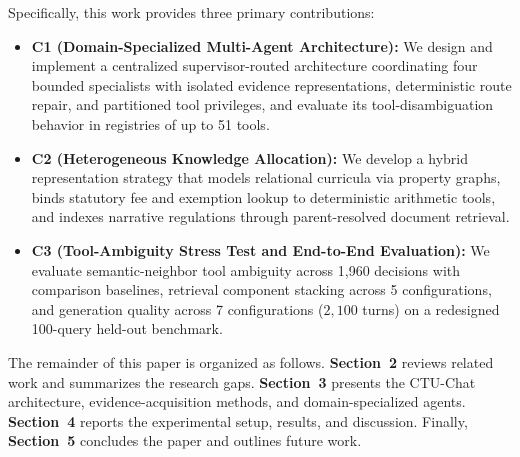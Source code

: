 Specifically, this work provides three primary contributions:
\begin{itemize}
    \setlength{\itemsep}{1.5pt}
    \setlength{\parsep}{0pt}
    \setlength{\parskip}{0pt}
    \item \textbf{C1 (Domain-Specialized Multi-Agent Architecture):} We design and implement a centralized supervisor-routed architecture coordinating four bounded specialists with isolated evidence representations, deterministic route repair, and partitioned tool privileges, and evaluate its tool-disambiguation behavior in registries of up to 51 tools.
    \item \textbf{C2 (Heterogeneous Knowledge Allocation):} We develop a hybrid representation strategy that models relational curricula via property graphs, binds statutory fee and exemption lookup to deterministic arithmetic tools, and indexes narrative regulations through parent-resolved document retrieval.
    \item \textbf{C3 (Tool-Ambiguity Stress Test and End-to-End Evaluation):} We evaluate semantic-neighbor tool ambiguity across 1,960 decisions with comparison baselines, retrieval component stacking across 5 configurations, and generation quality across 7 configurations ($2,100$ turns) on a redesigned 100-query held-out benchmark.
\end{itemize}

The remainder of this paper is organized as follows. \textbf{Section~2} reviews related work and summarizes the research gaps. \textbf{Section~3} presents the CTU-Chat architecture, evidence-acquisition methods, and domain-specialized agents. \textbf{Section~4} reports the experimental setup, results, and discussion. Finally, \textbf{Section~5} concludes the paper and outlines future work.
